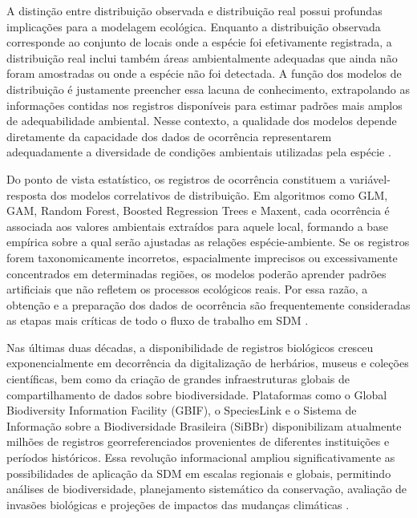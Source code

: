 A distinção entre distribuição observada e distribuição real possui profundas implicações para a modelagem ecológica. Enquanto a distribuição observada corresponde ao conjunto de locais onde a espécie foi efetivamente registrada, a distribuição real inclui também áreas ambientalmente adequadas que ainda não foram amostradas ou onde a espécie não foi detectada. A função dos modelos de distribuição é justamente preencher essa lacuna de conhecimento, extrapolando as informações contidas nos registros disponíveis para estimar padrões mais amplos de adequabilidade ambiental. Nesse contexto, a qualidade dos modelos depende diretamente da capacidade dos dados de ocorrência representarem adequadamente a diversidade de condições ambientais utilizadas pela espécie \parencite{araujo2007ensemble,thuiller2019uncertainty}.

Do ponto de vista estatístico, os registros de ocorrência constituem a variável-resposta dos modelos correlativos de distribuição. Em algoritmos como GLM, GAM, Random Forest, Boosted Regression Trees e Maxent, cada ocorrência é associada aos valores ambientais extraídos para aquele local, formando a base empírica sobre a qual serão ajustadas as relações espécie-ambiente. Se os registros forem taxonomicamente incorretos, espacialmente imprecisos ou excessivamente concentrados em determinadas regiões, os modelos poderão aprender padrões artificiais que não refletem os processos ecológicos reais. Por essa razão, a obtenção e a preparação dos dados de ocorrência são frequentemente consideradas as etapas mais críticas de todo o fluxo de trabalho em SDM \parencite{elith2009species,franklin2010mapping}.

Nas últimas duas décadas, a disponibilidade de registros biológicos cresceu exponencialmente em decorrência da digitalização de herbários, museus e coleções científicas, bem como da criação de grandes infraestruturas globais de compartilhamento de dados sobre biodiversidade. Plataformas como o Global Biodiversity Information Facility (GBIF), o SpeciesLink e o Sistema de Informação sobre a Biodiversidade Brasileira (SiBBr) disponibilizam atualmente milhões de registros georreferenciados provenientes de diferentes instituições e períodos históricos. Essa revolução informacional ampliou significativamente as possibilidades de aplicação da SDM em escalas regionais e globais, permitindo análises de biodiversidade, planejamento sistemático da conservação, avaliação de invasões biológicas e projeções de impactos das mudanças climáticas \parencite{peterson2011ecological,guisan2017habitat}.


